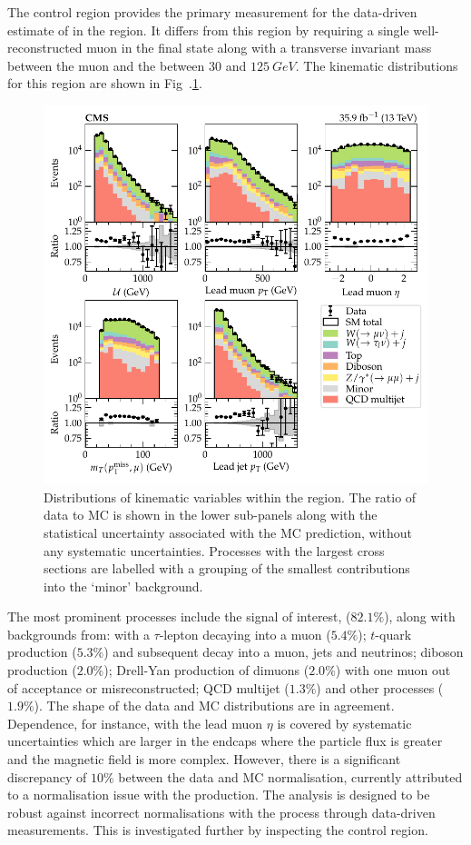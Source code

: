 The \muplusjets control region provides the primary measurement for the
data-driven estimate of \IWlv in the \metplusjets region. It differs from this
region by requiring a single well-reconstructed muon in the final state along
with a transverse invariant mass between the muon and the \ptmiss between $30$
and $\SI{125}{GeV}$. The kinematic distributions for this region are shown in
Fig~.\ref{fig:muplusjets}.
%
\begin{figure}[htb]
    \centering
    \includegraphics{chapters/042_backgrounds/images/singlemuon_dists.pdf}
    \caption[Single muon final state kinematics.]{
        Distributions of kinematic variables within the \muplusjets region. The ratio of data to MC is shown in the lower sub-panels along with the statistical uncertainty associated with the MC prediction, without any systematic uncertainties. Processes with the largest cross sections are labelled with a grouping of the smallest contributions into the `minor' background.
    }
    \label{fig:muplusjets}
\end{figure}
%
The most prominent processes include the signal of interest, \IWmvj ($82.1\%$), along with backgrounds from: \IWlv with a $\tau$-lepton decaying into
a muon ($5.4\%$); $t$-quark production ($5.3\%$) and subsequent decay into a
muon, jets and neutrinos; diboson production ($2.0\%$); Drell-Yan production
of dimuons ($2.0\%$) with one muon out of acceptance or misreconstructed; QCD
multijet ($1.3\%$) and other processes ($1.9\%$). The shape of the data and MC
distributions are in agreement. Dependence, for instance, with the lead
muon $\eta$ is covered by systematic uncertainties which are larger in
the endcaps where the particle flux is greater and the magnetic field is more
complex. However, there is a significant discrepancy of $10\%$ between the
data and MC normalisation, currently attributed to a normalisation issue with
the \IWj production. The analysis is designed to be robust against incorrect
normalisations with the \IVj process through data-driven measurements. This is
investigated further by inspecting the \eleplusjets control region.



